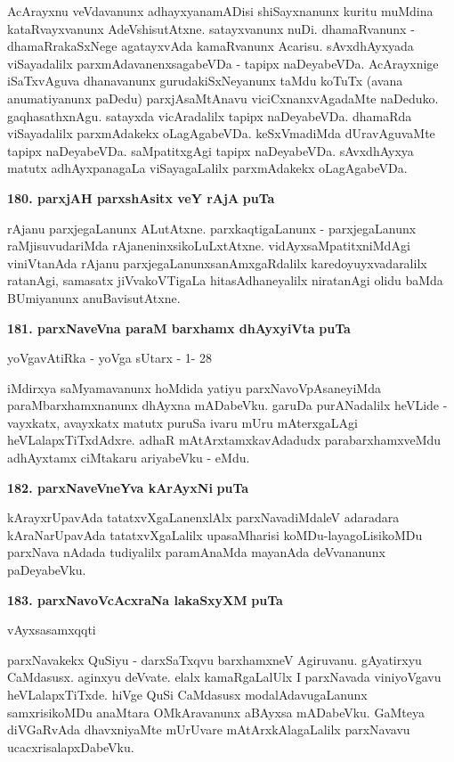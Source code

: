 \smallskip

AcArayxnu veVdavanunx adhayxyanamADisi shiSayxnanunx kuritu muMdina kataRvayxvanunx AdeVshisutAtxne. satayxvanunx nuDi. dhamaRvanunx - dhamaRrakaSxNege agatayxvAda kamaRvanunx Acarisu. sAvxdhAyxyada viSaya\-dalilx parxmAdavanenxsagabeVDa - tapipx naDeyabeVDa. AcArayxnige iSaTxvAguva dhanavanunx gurudakiSxNe\-yanunx taMdu koTuTx (avana anumatiyanunx paDedu) parxjAsaMtAnavu viciCxnanxvAgadaMte naDeduko. gaqhasathx\-nAgu. satayxda vicAradalilx tapipx naDeyabeVDa. dhamaRda viSayadalilx parxmAdakekx oLagAgabeVDa. keSxVmadiMda dUravAguvaMte tapipx naDeyabeVDa. saMpatitxgAgi tapipx naDeyabeVDa. sAvxdhAyxya matutx adhAyxpanagaLa viSayagaLalilx parxmAdakekx oLagAgabeVDa.

\medskip
\noindent
\textbf{180. parxjAH parxshAsitx veY rAjA} \hfill{\bf puTa \pageref{92}}

\smallskip
rAjanu parxjegaLanunx ALutAtxne. parxkaqtigaLanunx - parxjegaLanunx raMjisuvudariMda rAjaneninxsikoLuLxtAtxne. vidAyxsaMpatitxniMdAgi viniVtanAda rAjanu parxjegaLanunx\break sanAmxgaR\-dalilx karedoyuyxvadaralilx ratanAgi, samasatx jiVvakoVTigaLa hitasAdhaneyalilx niratanAgi olidu baMda BUmiyanunx anuBavisutAtxne.

\eject

\noindent
\textbf{181. parxNaveVna paraM barxhamx dhAyxyiVta} \hfill{\bf puTa \pageref{147}}

\hfill{yoVgavAtiRka - yoVga sUtarx - 1- 28}

\smallskip
iMdirxya saMyamavanunx hoMdida yatiyu parxNavoVpAsaneyiMda paraMbarxhamxnanunx dhAyxna mADa\-beVku. garuDa purANadalilx heVLide - vayxkatx, avayxkatx matutx puruSa ivaru mUru mAterxgaLAgi heVLa\-lapxTiTx\-dAdxre. adhaR mAtArxtamxkavAdadudx parabarxhamxveMdu adhAyxtamx ciMtakaru ariyabeVku - eMdu.


\medskip
\noindent
\textbf{182. parxNaveVneYva kArAyxNi} \hfill{\bf puTa \pageref{150}}

\smallskip
kArayxrUpavAda tatatxvXgaLanenxlAlx parxNavadiMdaleV adaradara kAraNarUpavAda tatatxvXgaLalilx upasaM\-hari\-si\- koMDu-layagoLisikoMDu parxNava nAdada tudiyalilx paramAnaMda mayanAda deVvananunx paDeya\-beVku.

\medskip
\noindent
\textbf{183. parxNavoVcAcxraNa lakaSxyXM} \hfill{\bf puTa \pageref{147}}

\hfill{vAyxsasamxqqti}

\smallskip
parxNavakekx QuSiyu - darxSaTxqvu barxhamxneV Agiruvanu. gAyatirxyu CaMdasusx. aginxyu deVvate. elalx kamaRgaLalUlx I parxNavada viniyoVgavu heVLalapxTiTxde. hiVge QuSi CaMdasusx modalAdavugaLanunx samxrisikoMDu anaMtara OMkAravanunx aBAyxsa mADabeVku. GaMteya diVGaRvAda dhavxniyaMte mUrU\-vare mAtArxkAlagaLalilx parxNavavu ucacxrisalapxDabeVku.


